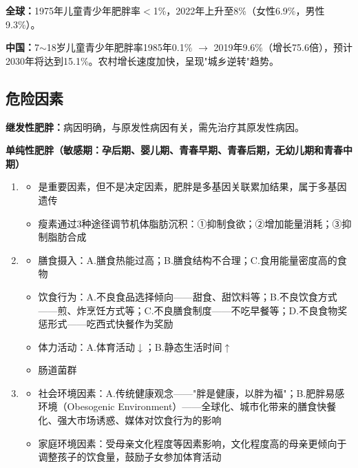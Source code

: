 \begin{keybox}
\textbf{全球：}1975年儿童青少年肥胖率$<$1\%，2022年上升至8\%（女性6.9\%，男性9.3\%）。

\textbf{中国：}7$\sim$18岁儿童青少年肥胖率1985年0.1\% $\rightarrow$ 2019年9.6\%（增长75.6倍），预计2030年将达到15.1\%。农村增长速度加快，呈现"城乡逆转"趋势。
\end{keybox}

\subsection{危险因素}

\begin{keybox}
\textbf{继发性肥胖：}病因明确，与原发性病因有关，需先治疗其原发性病因。

\textbf{单纯性肥胖（敏感期：孕后期、婴儿期、青春早期、青春后期，无幼儿期和青春中期）}

\begin{enumerate}[leftmargin=*]
    \item {}
    \begin{itemize}[leftmargin=*]
        \item 是重要因素，但不是决定因素，肥胖是多基因关联累加结果，属于多基因遗传
        \item 瘦素通过3种途径调节机体脂肪沉积：①抑制食欲；②增加能量消耗；③抑制脂肪合成
    \end{itemize}
    \item {}
    \begin{itemize}[leftmargin=*]
        \item 膳食摄入：A.膳食热能过高；B.膳食结构不合理；C.食用能量密度高的食物
        \item 饮食行为：A.不良食品选择倾向——甜食、甜饮料等；B.不良饮食方式——煎、炸烹饪方式等；C.不良膳食制度——不吃早餐等；D.不良食物奖惩形式——吃西式快餐作为奖励
        \item 体力活动：A.体育活动$\downarrow$；B.静态生活时间$\uparrow$
        \item 肠道菌群
    \end{itemize}
    \item {}
    \begin{itemize}[leftmargin=*]
        \item 社会环境因素：A.传统健康观念——"胖是健康，以胖为福"；B.肥胖易感环境（Obesogenic Environment）——全球化、城市化带来的膳食快餐化、强大市场诱惑、媒体对饮食行为的影响
        \item 家庭环境因素：受母亲文化程度等因素影响，文化程度高的母亲更倾向于调整孩子的饮食量，鼓励子女参加体育活动
    \end{itemize}
\end{enumerate}
\end{keybox}

